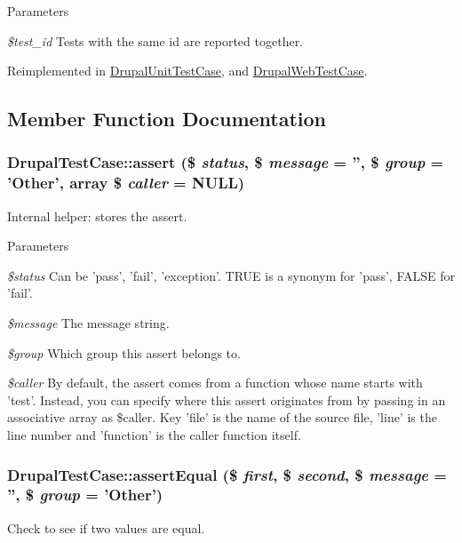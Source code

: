 \begin{DoxyParams}{Parameters}
\item[{\em \$test\_\-id}]Tests with the same id are reported together. \end{DoxyParams}


Reimplemented in \hyperlink{class_drupal_unit_test_case_a90ea280099eab5b03f4584e04c2b38dc}{DrupalUnitTestCase}, and \hyperlink{class_drupal_web_test_case_a76d165c12dc6042bae017b5c521e6ffa}{DrupalWebTestCase}.

\subsection{Member Function Documentation}
\hypertarget{class_drupal_test_case_ae4722b337aa79fcd753a2fc0c2f0b179}{
\subsubsection[{assert}]{\setlength{\rightskip}{0pt plus 5cm}DrupalTestCase::assert (\$ {\em status}, \/  \$ {\em message} = {\ttfamily ''}, \/  \$ {\em group} = {\ttfamily 'Other'}, \/  array \$ {\em caller} = {\ttfamily NULL})}}
\label{class_drupal_test_case_ae4722b337aa79fcd753a2fc0c2f0b179}
Internal helper: stores the assert.


\begin{DoxyParams}{Parameters}
\item[{\em \$status}]Can be 'pass', 'fail', 'exception'. TRUE is a synonym for 'pass', FALSE for 'fail'. \item[{\em \$message}]The message string. \item[{\em \$group}]Which group this assert belongs to. \item[{\em \$caller}]By default, the assert comes from a function whose name starts with 'test'. Instead, you can specify where this assert originates from by passing in an associative array as \$caller. Key 'file' is the name of the source file, 'line' is the line number and 'function' is the caller function itself. \end{DoxyParams}
\hypertarget{class_drupal_test_case_ab55dd157dcaed13231e0071a9f114878}{
\subsubsection[{assertEqual}]{\setlength{\rightskip}{0pt plus 5cm}DrupalTestCase::assertEqual (\$ {\em first}, \/  \$ {\em second}, \/  \$ {\em message} = {\ttfamily ''}, \/  \$ {\em group} = {\ttfamily 'Other'})}}
\label{class_drupal_test_case_ab55dd157dcaed13231e0071a9f114878}
Check to see if two values are equal.


